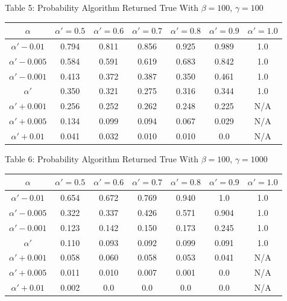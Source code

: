 \documentclass{article}
\begin{document}
\newpage
\begin{center}
Table 5: Probability Algorithm Returned True With $\beta=100$, $\gamma=100$ \\
\begin{tabular}{|c|c|c|c|c|c|c|}
\hline
$\alpha$ & $\alpha' = 0.5$ & $\alpha' = 0.6$ & $\alpha' = 0.7$ & $\alpha' = 0.8$ & $\alpha' = 0.9$ & $\alpha' = 1.0$ \\
\hline
$\alpha' -0.01$ & 0.794 & 0.811 & 0.856 & 0.925 & 0.989 & 1.0 \\
\hline
$\alpha'-0.005$ & 0.584 & 0.591 & 0.619 & 0.683 & 0.842 & 1.0 \\
\hline
$\alpha'-0.001$ & 0.413 & 0.372 & 0.387 & 0.350 & 0.461 & 1.0 \\
\hline
$\alpha'$            & 0.350 & 0.321 & 0.275 & 0.316 & 0.344 & 1.0 \\
\hline
$\alpha'+0.001$ & 0.256 & 0.252 & 0.262 & 0.248 & 0.225 & N/A \\
\hline
$\alpha'+0.005$ & 0.134 & 0.099 & 0.094 & 0.067 & 0.029 & N/A \\
\hline
$\alpha'+0.01 $ & 0.041 & 0.032 & 0.010 & 0.010 & 0.0 & N/A \\
\hline
\end{tabular}
\end{center}

\begin{center}
Table 6: Probability Algorithm Returned True With $\beta=100$, $\gamma=1000$ \\
\begin{tabular}{|c|c|c|c|c|c|c|}
\hline
$\alpha$ & $\alpha' = 0.5$ & $\alpha' = 0.6$ & $\alpha' = 0.7$ & $\alpha' = 0.8$ & $\alpha' = 0.9$ & $\alpha' = 1.0$ \\
\hline
$\alpha' -0.01$ & 0.654 & 0.672 & 0.769 & 0.940 & 1.0 & 1.0 \\
\hline
$\alpha'-0.005$ & 0.322 & 0.337 & 0.426 & 0.571 & 0.904 & 1.0 \\
\hline
$\alpha'-0.001$ & 0.123 & 0.142 & 0.150 & 0.173 & 0.245 & 1.0 \\
\hline
$\alpha'$            & 0.110 & 0.093 & 0.092 & 0.099 & 0.091 & 1.0 \\
\hline
$\alpha'+0.001$ & 0.058 & 0.060 & 0.058 & 0.053 & 0.041 & N/A \\
\hline
$\alpha'+0.005$ & 0.011 & 0.010 & 0.007 & 0.001 & 0.0 & N/A \\
\hline
$\alpha'+0.01 $ & 0.002 & 0.0 & 0.0 & 0.0 & 0.0 & N/A \\
\hline
\end{tabular}
\end{center}
\end{document}
